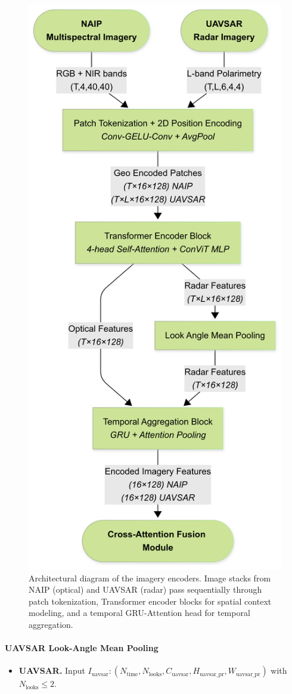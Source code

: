 \documentclass[remotesensing,article,accept,pdftex,moreauthors]{Definitions/mdpi}
\renewcommand{\hl}[1]{#1}
\begin{document}
\begin{figure}[H]

    \includegraphics[trim=0mm 0mm 20mm 0mm, clip, width=0.57\linewidth]{figures/Imagery_Encoders.png}
    \caption{Architectural diagram of the imagery encoders. Image stacks from NAIP (optical) and UAVSAR (radar) pass sequentially through patch tokenization, Transformer encoder blocks for spatial context modeling, and a temporal GRU-Attention head for temporal aggregation.}
    \label{fig:imgenc}
\end{figure}





\paragraph{UAVSAR Look-Angle Mean Pooling}
\begin{itemize}[leftmargin=*]
\item \textbf{\hl{UAVSAR.}}
      Input $I_{\text{uavsar}}: (N_{\text{time}}, N_{\text{looks}}, C_{\text{uavsar}}, H_{\text{uavsar\_pr}}, W_{\text{uavsar\_pr}})$ with \mbox{$N_{\text{looks}} \leq 2$}.
\end{itemize}
\end{document}
